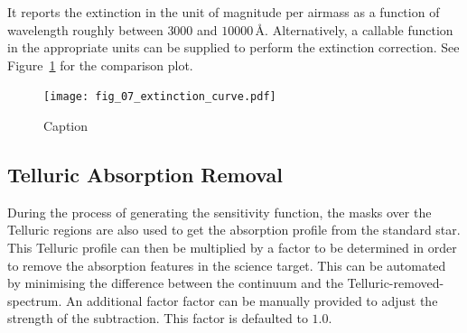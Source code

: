 \documentclass[fleqn,usenatbib]{mnras}
\begin{document}
It reports the extinction in the unit of magnitude per airmass as a
function of wavelength roughly between $3000$ and $10000$\,\AA.
Alternatively, a callable function in the appropriate units can be
supplied to perform the extinction correction. See Figure~\ref{fig:extinction}
for the comparison plot.

\begin{figure}
    \centering
    \texttt{[image: fig\_07\_extinction\_curve.pdf]}
    \caption{Caption}
    \label{fig:extinction}
\end{figure}

\subsection*{Telluric Absorption Removal}
During the process of generating the sensitivity function, the masks
over the Telluric regions are also used to get the absorption profile
from the standard star. This Telluric profile can then be multiplied
by a factor to be determined in order to remove the absorption features
in the science target. This can be automated by minimising the difference
between the continuum and the Telluric-removed-spectrum. An additional
factor factor can be manually provided to adjust the strength of the
subtraction. This factor is defaulted to $1.0$.





\end{document}
